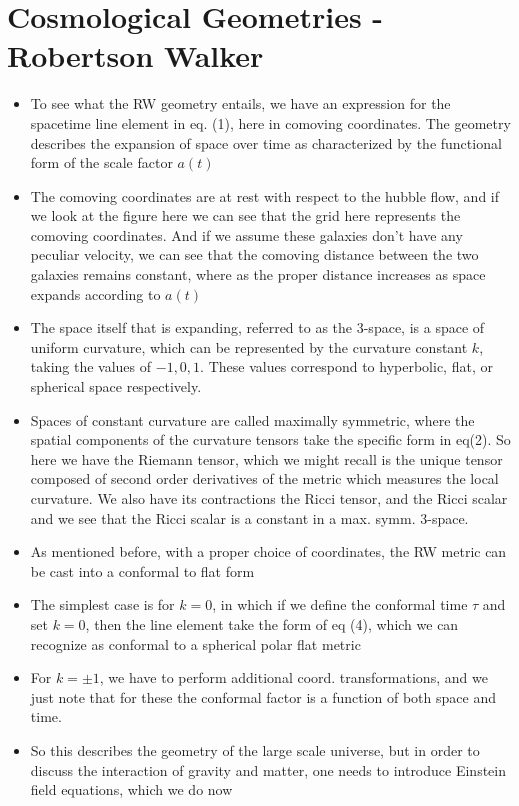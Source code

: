 \documentclass[10pt,letterpaper]{article}
\numberwithin{equation}{section}
\begin{document}
\section{Cosmological Geometries - Robertson Walker}
\begin{itemize}
	\item To see what the RW geometry entails, we have an expression for the spacetime line element in eq. (1), here in comoving coordinates. The geometry describes the expansion of space over time as characterized by the functional form of the scale factor $a(t)$
	\item The comoving coordinates are at rest with respect to the hubble flow, and if we look at the figure here we can see that the grid here represents the comoving coordinates. And if we assume these galaxies don't have any peculiar velocity, we can see that the comoving distance between the two galaxies remains constant, where as the proper distance increases as space expands according to $a(t)$
	\item The space itself that is expanding, referred to as the 3-space, is a space of uniform curvature, which can be represented by the curvature constant $k$, taking the values of $-1, 0, 1 $. These values correspond to hyperbolic, flat, or spherical space respectively.
	\item Spaces of constant curvature are called maximally symmetric, where the spatial components of the curvature tensors take the specific form in eq(2). So here we have the Riemann tensor, which we might recall is the unique tensor composed of second order derivatives of the metric which measures the local curvature. We also have its contractions the Ricci tensor, and the Ricci scalar and we see that the Ricci scalar is a constant in a max. symm. 3-space.
	\item As mentioned before, with a proper choice of coordinates, the RW metric can be cast into a conformal to flat form
	\item The simplest case is for $k=0$, in which if we define the conformal time $\tau$ and set $k=0$, then the line element take the form of eq (4), which we can recognize as conformal to a spherical polar flat metric
	\item For $k=\pm 1$, we have to perform additional coord. transformations, and we just note that for these the conformal factor is a function of both space and time.
	\item So this describes the geometry of the large scale universe, but in order to discuss the interaction of gravity and matter, one needs to introduce Einstein field equations, which we do now
\end{itemize}
\end{document}
